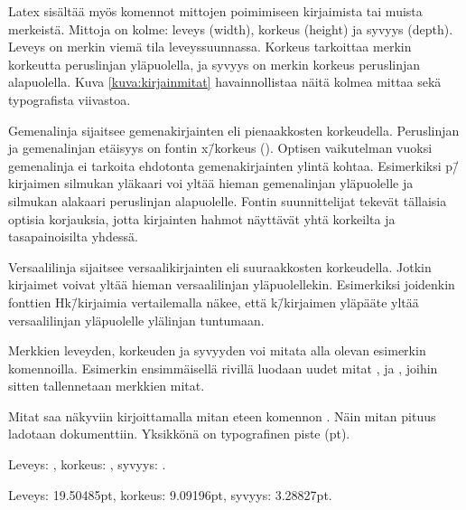 Latex sisältää myös komennot mittojen poimimiseen kirjaimista tai muista
merkeistä. Mittoja on kolme: leveys (\textenglish{width}), korkeus
(\textenglish{height}) ja syvyys (\textenglish{depth}). Leveys on merkin
viemä tila leveyssuunnassa. Korkeus tarkoittaa merkin korkeutta
peruslinjan yläpuolella, ja syvyys on merkin korkeus peruslinjan
alapuolella. Kuva \ref{kuva:kirjainmitat} havainnollistaa näitä kolmea
mittaa sekä typografista viivastoa.

Gemenalinja sijaitsee gemenakirjainten eli pien\-aak\-kos\-ten
korkeudella. Peruslinjan ja gemenalinjan etäisyys on fontin x\=/korkeus
(\koodi{1ex}). Optisen vaikutelman vuoksi gemenalinja ei tarkoita
ehdotonta gemenakirjainten ylintä kohtaa. Esimerkiksi p\=/kirjaimen
silmukan yläkaari voi yltää hieman gemenalinjan yläpuolelle ja silmukan
alakaari peruslinjan alapuolelle. Fontin suunnittelijat tekevät
tällaisia optisia korjauksia, jotta kirjainten hahmot näyttävät yhtä
korkeilta ja tasapainoisilta yhdessä.

Versaalilinja sijaitsee versaalikirjainten eli suur\-aak\-kos\-ten
korkeudella. Jotkin kirjaimet voivat yltää hieman versaalilinjan
yläpuolellekin. Esimerkiksi joidenkin fonttien Hk\=/kirjaimia
vertailemalla näkee, että k\=/kirjaimen yläpääte yltää versaalilinjan
yläpuolelle ylälinjan tuntumaan.

\pagebreak[3]

Merkkien leveyden, korkeuden ja syvyyden voi mitata alla olevan
esimerkin komennoilla. Esimerkin ensimmäisellä rivillä luodaan uudet
mitat ,  ja , joihin sitten tallennetaan merkkien mitat.

\begin{koodilohkosis}
  \newlength{\leveys} \newlength{\korkeus} \newlength{\syvyys}
  \settowidth{\leveys}{abc} %
\end{koodilohkosis}

\pagebreak[3]

Mitat saa näkyviin kirjoittamalla mitan eteen komennon . Näin mitan pituus ladotaan dokumenttiin. Yksikkönä on
typografinen piste (pt).

\begin{koodilohkosis}
  Leveys: \the\leveys, korkeus: \the\korkeus, syvyys: \the\syvyys.
\end{koodilohkosis}

\begin{tulossis}
  Leveys: 19.50485pt, korkeus: 9.09196pt, syvyys: 3.28827pt.
\end{tulossis}

